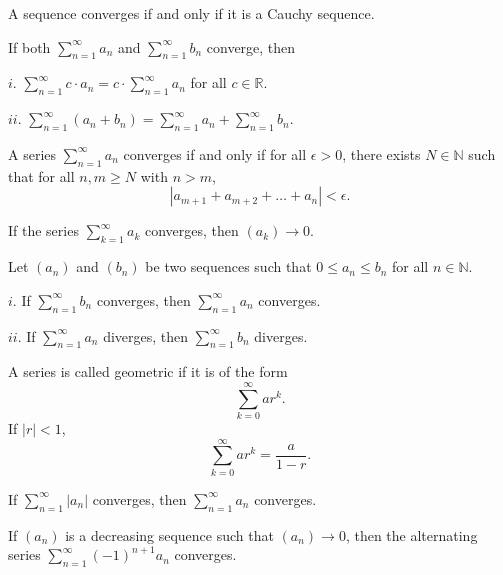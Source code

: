 \documentclass{article}
\begin{document}
    A sequence converges if and only if it is a Cauchy sequence.

\medskip
{}

    If both $\sum\limits_{n=1}^\infty a_n$ and $\sum\limits_{n=1}^\infty b_n$ converge, then
    
    $i$. $\sum\limits_{n=1}^\infty c \cdot a_n = c \cdot \sum\limits_{n=1}^\infty a_n$ for all $c \in \mathbb R$.
    
    $ii$. $\sum\limits_{n=1}^\infty (a_n + b_n) = \sum\limits_{n=1}^\infty a_n + \sum\limits_{n=1}^\infty b_n$.

\medskip
{}

    A series $\sum\limits_{n=1}^\infty a_n$ converges if and only if for all $\epsilon > 0$, there exists $N \in \mathbb N$ such that for all $n,m \geq N$ with $n > m$, $$|a_{m+1}+a_{m+2} + \hdots + a_n| < \epsilon.$$

\medskip
{}

    If the series $\sum\limits_{k=1}^\infty a_k$ converges, then $(a_k) \to 0$.

\medskip
{}

    Let $(a_n)$ and $(b_n)$ be two sequences such that $0 \leq a_n \leq b_n$ for all $n \in \mathbb N$.
    
    $i$. If $\sum\limits_{n=1}^\infty b_n$ converges, then $\sum\limits_{n=1}^\infty a_n$ converges.
    
    $ii$. If $\sum\limits_{n=1}^\infty a_n$ diverges, then $\sum\limits_{n=1}^\infty b_n$ diverges.

\medskip
{}

    A series is called geometric if it is of the form $$\sum_{k=0}^\infty ar^k.$$ If $|r| < 1$, $$\sum_{k=0}^\infty ar^k = \frac a{1-r}.$$

\medskip
{}

    If $\sum\limits_{n=1}^\infty |a_n|$ converges, then $\sum\limits_{n=1}^\infty a_n$ converges.

\medskip
{}

    If $(a_n)$ is a decreasing sequence such that $(a_n) \to 0$, then the alternating series $\sum\limits_{n=1}^\infty(-1)^{n+1}a_n$ converges.

\medskip
{}
\end{document}
